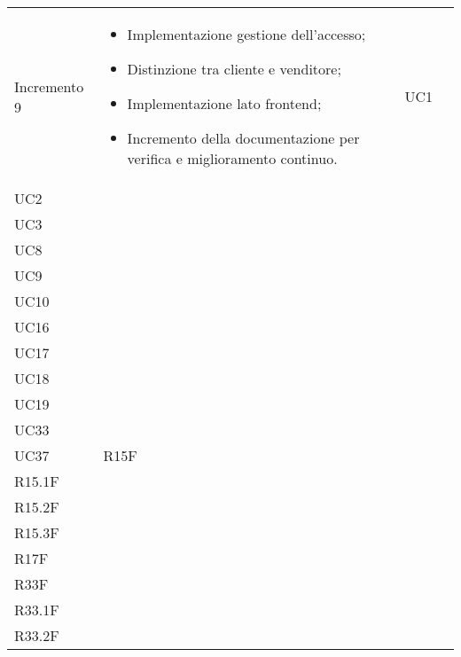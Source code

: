 \begin{longtable}{
    >{\centering}p{}
    >{\raggedright}p{}
    >{\centering}p{}
    >{\centering}p{}
    }
    Incremento 9                  &
    \vspace{-15px}
    \begin{itemize}
        \renewcommand\labelitemi{-}
        \item Implementazione gestione dell'accesso;
        \item Distinzione tra cliente e venditore;
        \item Implementazione lato frontend;
        \item Incremento della documentazione per verifica e miglioramento continuo.
    \end{itemize}
                                  & UC1                                                                                                                                                                                      \\ UC2 \\ UC3 \\ UC8 \\ UC9 \\ UC10                                                                                                                                                                                 \\ UC16 \\ UC17  \\ UC18                                                                                                                                                                                   \\ UC19 \\ UC33 \\ UC37
                                  & R15F                                                                                                                                                                                     \\ R15.1F \\ R15.2F \\ R15.3F \\ R17F \\ R33F \\ R33.1F \\ R33.2F
    \tabularnewline


\end{longtable}
